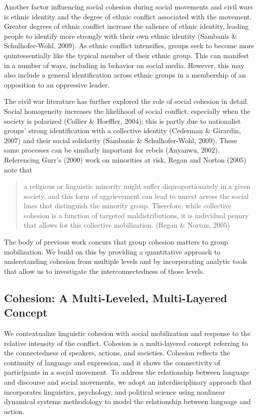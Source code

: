 \documentclass[
  english,
  man]{apa6}
\begin{document}
Another factor influencing social cohesion during social movements and
civil wars is ethnic identity and the degree of ethnic conflict associated with
the movement. Greater degrees of ethnic conflict increase the salience of
ethnic identity, leading people to identify more strongly with their own
ethnic identity (Sambanis \& Schulhofer-Wohl, 2009). As ethnic conflict
intensifies, groups seek to become more quintessentially like the typical
member of their ethnic group. This can manifest in a number of ways, including
in behavior on social media. However, this may also include a general identification
across ethnic groups in a membership of an opposition to an oppressive leader.

The civil war literature has further explored the role of social cohesion in
detail. Social homogeneity increases the likelihood of social conflict,
especially when the society is polarized (Collier \& Hoeffler, 2004); this is partly
due to nationalist groups' strong identification with a collective identity
(Cederman \& Girardin, 2007) and their social solidarity (Sambanis \& Schulhofer-Wohl, 2009). These
same processes can be similarly important for rebels (Anyanwu, 2002).
Referencing Gurr's (2000) work on minorities at
risk, Regan and Norton (2005) note that

\begin{quote}
a religious or linguistic minority
might suffer disproportionately in a given society, and this form of
aggrievement can lead to unrest across the social lines that distinguish the
minority group. Therefore, while collective cohesion is a function of targeted
maldistributions, it is individual penury that allows for this collective
mobilization. (Regan \& Norton, 2005)
\end{quote}

The body of previous work concurs that group cohesion matters to group
mobilization. We build on this by providing a quantitative approach to
understanding cohesion from multiple levels and by incorporating analytic tools
that allow us to investigate the interconnectedness of those levels.

\hypertarget{cohesion-a-multi-leveled-multi-layered-concept}{%
\subsection{Cohesion: A Multi-Leveled, Multi-Layered Concept}\label{cohesion-a-multi-leveled-multi-layered-concept}}

We contextualize linguistic cohesion with social mobilization and response to the relative
intensity of the conflict. Cohesion is a multi-layered concept referring to the
connectedness of speakers, actions, and societies. Cohesion reflects the
continuity of language and expression, and it shows the connectivity of
participants in a social movement. To address the relationship between language
and discourse and social movements, we adopt an interdisciplinary approach that
incorporates linguistics, psychology, and political science using nonlinear
dynamical systems methodology to model the relationship between language and
action.
\end{document}
